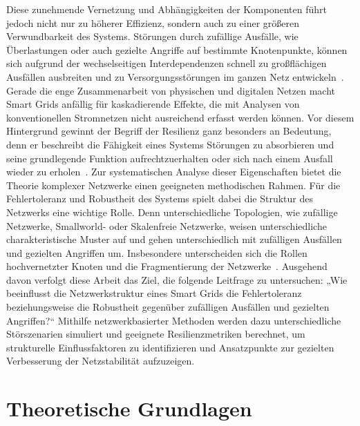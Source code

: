 \documentclass[14pt,a4paper]{scrartcl}
\begin{document}
Diese zunehmende Vernetzung und Abhängigkeiten der Komponenten führt jedoch nicht nur
 zu höherer Effizienz, sondern auch zu einer größeren Verwundbarkeit des Systems. 
 Störungen durch zufällige Ausfälle, wie Überlastungen oder auch gezielte Angriffe 
 auf bestimmte Knotenpunkte, können sich aufgrund der wechselseitigen 
 Interdependenzen schnell zu großflächigen Ausfällen ausbreiten und zu 
 Versorgungsstörungen im ganzen Netz entwickeln~\cite[S.~1025]{Buldyrev2010Interdependent}. 
 Gerade die enge Zusammenarbeit von physischen und digitalen Netzen macht Smart Grids 
 anfällig für kaskadierende Effekte, die mit Analysen von konventionellen Stromnetzen 
 nicht ausreichend erfasst werden können.
Vor diesem Hintergrund gewinnt der Begriff der Resilienz ganz besonders an Bedeutung,
 denn er beschreibt die Fähigkeit eines Systems Störungen zu absorbieren und seine grundlegende Funktion aufrechtzuerhalten oder sich nach einem Ausfall wieder zu erholen~\cite[S.~17]{Holling1973Resilience}. Zur systematischen Analyse dieser Eigenschaften bietet die Theorie komplexer Netzwerke einen geeigneten methodischen Rahmen.
Für die Fehlertoleranz und Robustheit des Systems spielt dabei die Struktur des Netzwerks eine wichtige Rolle. Denn unterschiedliche Topologien, wie zufällige Netzwerke, Smallworld- oder Skalenfreie Netzwerke, weisen unterschiedliche charakteristische Muster auf und gehen unterschiedlich mit zufälligen Ausfällen und gezielten Angriffen um. Insbesondere unterscheiden sich die Rollen hochvernetzter Knoten und die Fragmentierung der Netzwerke~\cite[S.~105ff]{Albert2000ErrorAttack}.
Ausgehend davon verfolgt diese Arbeit das Ziel, die folgende Leitfrage zu untersuchen: „Wie beeinflusst die Netzwerkstruktur eines Smart Grids die Fehlertoleranz beziehungsweise die Robustheit gegenüber zufälligen Ausfällen und gezielten Angriffen?“ Mithilfe netzwerkbasierter Methoden werden dazu unterschiedliche Störszenarien simuliert und geeignete Resilienzmetriken berechnet, um strukturelle Einflussfaktoren zu identifizieren und Ansatzpunkte zur gezielten Verbesserung der Netzstabilität aufzuzeigen.

\section{Theoretische Grundlagen}
\end{document}
